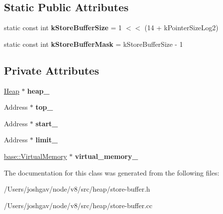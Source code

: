 \subsection*{Static Public Attributes}
\begin{DoxyCompactItemize}
\item 
static const int {\bfseries k\+Store\+Buffer\+Size} = 1 $<$$<$ (14 + k\+Pointer\+Size\+Log2)\hypertarget{classv8_1_1internal_1_1_store_buffer_ad1e8d91749d99db471ce7f75ddc6dbfc}{}\label{classv8_1_1internal_1_1_store_buffer_ad1e8d91749d99db471ce7f75ddc6dbfc}

\item 
static const int {\bfseries k\+Store\+Buffer\+Mask} = k\+Store\+Buffer\+Size -\/ 1\hypertarget{classv8_1_1internal_1_1_store_buffer_aba773520960e5bb924b2da224136f597}{}\label{classv8_1_1internal_1_1_store_buffer_aba773520960e5bb924b2da224136f597}

\end{DoxyCompactItemize}
\subsection*{Private Attributes}
\begin{DoxyCompactItemize}
\item 
\hyperlink{classv8_1_1internal_1_1_heap}{Heap} $\ast$ {\bfseries heap\+\_\+}\hypertarget{classv8_1_1internal_1_1_store_buffer_a795795da67e7d66210e3dd99c0c23bc5}{}\label{classv8_1_1internal_1_1_store_buffer_a795795da67e7d66210e3dd99c0c23bc5}

\item 
Address $\ast$ {\bfseries top\+\_\+}\hypertarget{classv8_1_1internal_1_1_store_buffer_ac7f49c93558618be64bf209734499e6d}{}\label{classv8_1_1internal_1_1_store_buffer_ac7f49c93558618be64bf209734499e6d}

\item 
Address $\ast$ {\bfseries start\+\_\+}\hypertarget{classv8_1_1internal_1_1_store_buffer_ac7fd76199db652e59c06b0c21f218f7a}{}\label{classv8_1_1internal_1_1_store_buffer_ac7fd76199db652e59c06b0c21f218f7a}

\item 
Address $\ast$ {\bfseries limit\+\_\+}\hypertarget{classv8_1_1internal_1_1_store_buffer_a2ef311a7a136673b9beaa9dac38f2191}{}\label{classv8_1_1internal_1_1_store_buffer_a2ef311a7a136673b9beaa9dac38f2191}

\item 
\hyperlink{classv8_1_1base_1_1_virtual_memory}{base\+::\+Virtual\+Memory} $\ast$ {\bfseries virtual\+\_\+memory\+\_\+}\hypertarget{classv8_1_1internal_1_1_store_buffer_a7d0a7ea917f0ca94c3d1b53599b4c301}{}\label{classv8_1_1internal_1_1_store_buffer_a7d0a7ea917f0ca94c3d1b53599b4c301}

\end{DoxyCompactItemize}


The documentation for this class was generated from the following files\+:\begin{DoxyCompactItemize}
\item 
/\+Users/joshgav/node/v8/src/heap/store-\/buffer.\+h\item 
/\+Users/joshgav/node/v8/src/heap/store-\/buffer.\+cc\end{DoxyCompactItemize}
